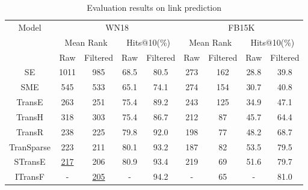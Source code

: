 \documentclass[11pt,a4paper]{article}
\begin{document}
\begin{table*}[t]
\centering \caption{Evaluation results on link prediction}
\begin{tabular}{|c|c|c|c|c|c|c|c|c|}
\hline
\multicolumn{1}{|c|}{\multirow{3}{*}{Model}} & \multicolumn{4}{|c|}{WN18}                                        & \multicolumn{4}{|c|}{FB15K}                                       \\
\cline{2-9}
\multicolumn{1}{|c|}{}                       & \multicolumn{2}{|c|}{Mean Rank} & \multicolumn{2}{|c|}{Hits@10(\%)} & \multicolumn{2}{|c|}{Mean Rank} & \multicolumn{2}{|c|}{Hits@10(\%)} \\
\cline{2-9}
\multicolumn{1}{|c|}{}                       & Raw         & Filtered        & Raw          & Filtered         & Raw         & Filtered        & Raw          & Filtered         \\
\hline
SE                                         & 1011        & 985             & 68.5         & 80.5             & 273         & 162             & 28.8         & 39.8             \\
SME                                        & 545         & 533             & 65.1         & 74.1             & 274         & 154             & 30.7         & 40.8             \\
TransE                                     & 263         & 251             & 75.4         & 89.2             & 243         & 125             & 34.9         & 47.1             \\
TransH                                     & 318         & 303             & 75.4         & 86.7             & 212         & 87              & 45.7         & 64.4             \\
TransR                                     & 238         & 225             & 79.8         & 92.0               & 198         & 77              & 48.2         & 68.7             \\
TranSparse                                 & 223         & 211             & 80.1         & 93.2             & 187         & 82              & 53.5         & 79.5             \\
STransE                                    & \underline{217}         & 206             & 80.9         & 93.4             & 219         & 69              & 51.6         & 79.7             \\
ITransF                                    & -           & \underline{205}             & -            & 94.2             & -           & 65              & -            & 81.0               \\

\end{tabular}
\end{table*}
\end{document}
